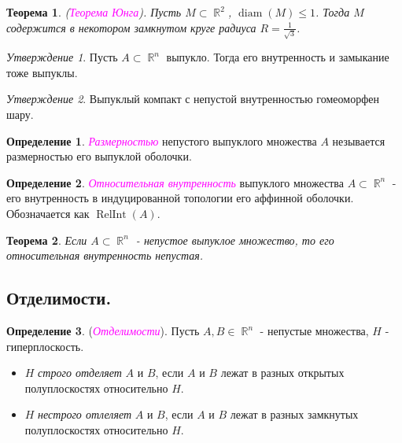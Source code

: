 \documentclass[a4paper,100pt]{article}
\theoremstyle{indented}
\newtheorem{theorem}{Теорема}
\theoremstyle{definition}
\newtheorem{defn}{Определение}
\theoremstyle{remark}
\newtheorem{stat}{Утверждение}
\DeclareMathOperator{\diam}{diam}
\DeclareMathOperator{\RelInt}{RelInt}
\DeclareMathOperator{\RR}{\mathbb{R}}
\begin{document}
\begin{theorem}
    (\textit{\textcolor{magenta}{\hypertarget{s95}{Теорема Юнга}}}). Пусть $M \subset \RR^2$, $\diam (M) \leq 1$. Тогда $M$ содержится в некотором замкнутом круге радиуса $R=\frac{1}{\sqrt{3}}$. 
\end{theorem}

\begin{stat}
    Пусть $A \subset \RR^n$ выпукло. Тогда его внутренность и замыкание тоже выпуклы.
\end{stat}

\begin{stat}
    Выпуклый компакт с непустой внутренностью гомеоморфен шару.
\end{stat}

\begin{defn}
    \textit{\textcolor{magenta}{\hypertarget{s96}{Размерностью}}} непустого выпуклого множества $A$ незывается размерностью его выпуклой оболочки.
\end{defn}

\begin{defn}
    \textit{\textcolor{magenta}{\hypertarget{s97}{Относительная внутренность}}} выпуклого множества $A \subset \RR^n$ - его внутренность в индуцированной топологии его аффинной оболочки. Обозначается как $\RelInt(A)$. 
\end{defn}

\begin{theorem}
    Если $A \subset \RR^n$ - непустое выпуклое множество, то его относительная внутренность непустая.
\end{theorem}

\subsection{Отделимости.}

\begin{defn}
    (\textit{\textcolor{magenta}{\hypertarget{s98}{Отделимости}}}). Пусть $A, B \in \RR^n$ - непустые множества, $H$ - гиперплоскость. 

    \begin{itemize}
        \item $H$ \textit{строго отделяет} $A$ и $B$, если $A$ и $B$ лежат в разных открытых полуплоскостях относительно $H$. 
        \item $H$ \textit{нестрого отлеляет} $A$ и $B$, если $A$ и $B$ лежат в разных замкнутых полуплоскостях относительно $H$. 
    \end{itemize}
\end{defn}
\end{document}

